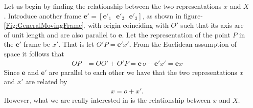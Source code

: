 \documentclass[graybox,envcountchap,sectrefs]{svmonoMuga}
\begin{document}
Let us begin by finding the relationship between the two representations $x$ and $X$. 
Introduce another frame $\mathbf{e}'=[\mathbf{e}'_1\:\:\:
 \mathbf{e}'_2\:\:\: \mathbf{e}'_3]$, as shown in figure-\ref{Fig:GeneralMovingFrame}, with origin coinciding with $O'$ such that its axis are of unit length and are also parallel to $\mathbf{e}$. Let the representation of the point $P$ in the $\mathbf{e}'$ frame be $x'$. That is let $O'P=\mathbf{e}'x'$.
From the Euclidean assumption of space it follows that
\begin{align*}
OP&=OO'+O'P=\mathbf{e}\, o+\mathbf{e}'x'=\mathbf{e}x
\end{align*}
Since $\mathbf{e}$ and $\mathbf{e}'$ are parallel to each other we have that the two representations 
$x$ and $x'$ are related by
\begin{align}
x=o+x'.\label{eq:ParallelFramesPosition}
\end{align}
However, what we are really interested in is the relationship between $x$ and $X$. 
\end{document}
